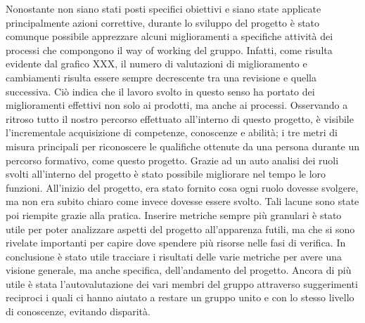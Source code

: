 	\newline\newline
	Nonostante non siano stati posti specifici obiettivi e siano state applicate principalmente azioni correttive, durante lo sviluppo del progetto è stato comunque possibile apprezzare alcuni miglioramenti a specifiche attività dei processi che compongono il way of working del gruppo. Infatti, come risulta evidente dal grafico XXX, il numero di valutazioni di miglioramento e cambiamenti risulta essere sempre decrescente tra una revisione e quella successiva. Ciò indica che il lavoro svolto in questo senso ha portato dei miglioramenti effettivi non solo ai prodotti, ma anche ai processi.
	\newline\newline
	Osservando a ritroso tutto il nostro percorso effettuato all’interno di questo progetto, è visibile l’incrementale acquisizione di competenze, conoscenze e abilità; i tre metri di misura principali per riconoscere le qualifiche ottenute da una persona durante un percorso formativo, come questo progetto.
	\newline
	Grazie ad un auto analisi dei ruoli svolti all’interno del progetto è stato possibile migliorare nel tempo le loro funzioni. All’inizio del progetto, era stato fornito cosa ogni ruolo dovesse svolgere, ma non era subito chiaro come invece dovesse essere svolto. Tali lacune sono state poi riempite grazie alla pratica.
	\newline
	Inserire metriche sempre più granulari è stato utile per poter analizzare aspetti del progetto all’apparenza futili, ma che si sono rivelate importanti per capire dove spendere più risorse nelle fasi di verifica.
	\newline
	In conclusione è stato utile tracciare i risultati delle varie metriche per avere una visione generale, ma anche specifica, dell’andamento del progetto. Ancora di più utile è stata l’autovalutazione dei vari membri del gruppo attraverso suggerimenti reciproci i quali ci hanno aiutato a restare un gruppo unito e con lo stesso livello di conoscenze, evitando disparità.

